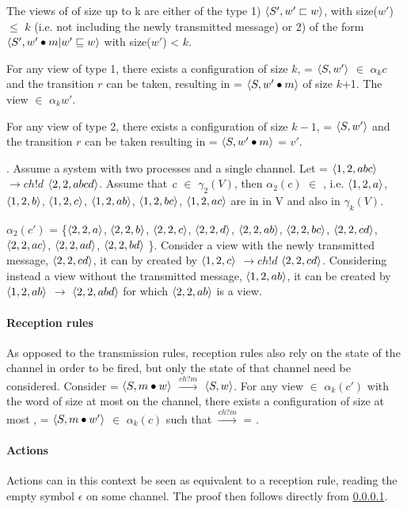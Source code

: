 The views of  of size up to k are either of the type 1) $\langle S', w' \sqsubset w\rangle$, with size($w'$) $\leq$ $k$ (i.e. not including the newly transmitted message) or 2) of the form $\langle S', w' \bullet m | w' \sqsubseteq w\rangle$ with size($w'$) < $k$.

For any view of type 1, there exists a configuration of size $k$,  = $\langle S, w'\rangle$ $\in$ $\alpha_k{c}$ and the transition $r$ can be taken, resulting in  = $\langle S, w'\bullet m\rangle$ of size $k$+1. The view  $\in$ $\alpha_k{w'}$.

For any view of type 2, there exists a configuration of size $k-1$,  = $\langle S, w'\rangle$ and the transition $r$ can be taken resulting in  = $\langle S, w'\bullet m\rangle$ = $v'$.

. Assume a system with two processes and a single channel. Let  = $\langle1,2,abc\rangle$ $\rightarrow{ch!d}$ $\langle2,2,abcd\rangle$. Assume that $\emph{c}$ $\in$ $\gamma_2(V)$, then $\alpha_2(c)$ $\in$ , i.e. 
$\langle1,2,a\rangle$, $\langle1,2,b\rangle$, $\langle1,2,c\rangle$, $\langle1,2,ab\rangle$, $\langle1,2,bc\rangle$, $\langle1,2,ac\rangle$ are in in V and also in $\gamma_k(V)$.

$\alpha_2(c')$ = \{$\langle2,2,a\rangle$, $\langle2,2,b\rangle$, $\langle2,2,c\rangle$, $\langle2,2,d\rangle$, $\langle2,2,ab\rangle$, $\langle2,2,bc\rangle$, $\langle2,2,cd\rangle$, $\langle2,2,ac\rangle$, $\langle2,2,ad\rangle$, $\langle2,2,bd\rangle $ \}. Consider a view with the newly transmitted message, $\langle2,2,cd\rangle$, it can by created by $\langle1,2,c\rangle$ $\rightarrow{ch!d}$ $\langle2,2,cd\rangle$. Considering instead a view without the transmitted message, $\langle1,2,ab\rangle$, it can be created by $\langle1,2,ab\rangle$ $\rightarrow$ $\langle2,2,abd\rangle$ for which $\langle2,2,ab\rangle$ is a view.

\paragraph{Reception rules}
\label{proofreception}
As opposed to the transmission rules, reception rules also rely on the state of the channel in order to be fired, but only the state of that channel need be considered. Consider  = $\langle S, m\bullet w\rangle$ $\xrightarrow{ch?m}$ $\langle S, w\rangle$. For any view  $\in$ $\alpha_k(c')$ with the word  of size at most  on the channel, there exists a configuration of size at most ,  = $\langle S, m\bullet w'\rangle$ $\in$ $\alpha_k(c)$ such that  $\xrightarrow{ch?m}$  = .

\paragraph{Actions}
Actions can in this context be seen as equivalent to a reception rule, reading the empty symbol $\epsilon$ on some channel. The proof then follows directly from \ref{proofreception}.
